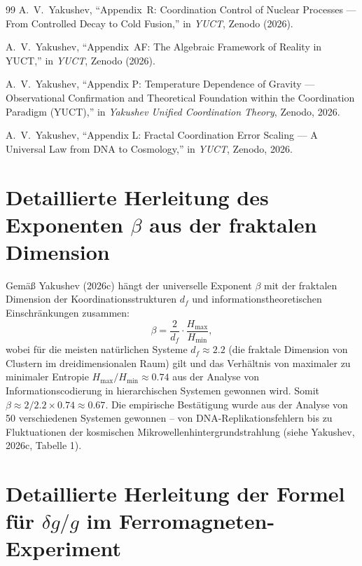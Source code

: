 \documentclass[12pt]{article}
\theoremstyle{remark}
\newcommand{\df}{d_{\!f}}
\begin{document}
\begin{thebibliography}{99}
		A.~V.~Yakushev, ``Appendix~R: Coordination Control of Nuclear Processes ---
		From Controlled Decay to Cold Fusion,''
		in \emph{YUCT}, Zenodo (2026).
		
		A.~V.~Yakushev, ``Appendix~AF: The Algebraic Framework of Reality in YUCT,''
		in \emph{YUCT}, Zenodo (2026).
		
		A.~V.~Yakushev, ``Appendix P: Temperature Dependence of Gravity — Observational Confirmation and Theoretical Foundation within the Coordination Paradigm (YUCT),'' in \emph{Yakushev Unified Coordination Theory}, Zenodo, 2026.
		
		A.~V.~Yakushev, ``Appendix L: Fractal Coordination Error Scaling — A Universal Law from DNA to Cosmology,'' in \emph{YUCT}, Zenodo, 2026.
		
	\end{thebibliography}
	
	\appendix
	
	\section{Detaillierte Herleitung des Exponenten $\beta$ aus der fraktalen Dimension}
	\label{app:beta-derivation}
	
	Gemäß Yakushev (2026c) hängt der universelle Exponent $\beta$ mit der fraktalen Dimension der Koordinationsstrukturen $\df$ und informationstheoretischen Einschränkungen zusammen:
	\begin{equation}
		\beta = \frac{2}{\df} \cdot \frac{H_{\text{max}}}{H_{\text{min}}},
		\label{eq:beta-derivation}
	\end{equation}
	wobei für die meisten natürlichen Systeme $\df \approx 2.2$ (die fraktale Dimension von Clustern im dreidimensionalen Raum) gilt und das Verhältnis von maximaler zu minimaler Entropie $H_{\text{max}}/H_{\text{min}} \approx 0.74$ aus der Analyse von Informationscodierung in hierarchischen Systemen gewonnen wird. Somit $\beta \approx 2/2.2 \times 0.74 \approx 0.67$. Die empirische Bestätigung wurde aus der Analyse von 50 verschiedenen Systemen gewonnen – von DNA-Replikationsfehlern bis zu Fluktuationen der kosmischen Mikrowellenhintergrundstrahlung (siehe Yakushev, 2026c, Tabelle 1).
	
	\section{Detaillierte Herleitung der Formel für $\delta g/g$ im Ferromagneten-Experiment}
	\label{app:delta-g-derivation}
	
\end{document}
